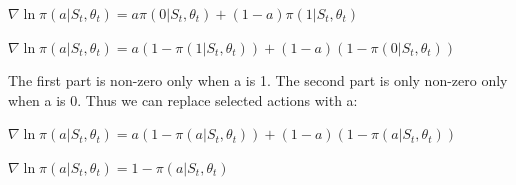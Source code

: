 \documentclass[11pt]{article}
\begin{document}
    \noindent $  \nabla \ln \pi(a | S_t, \theta_t) = a \pi(0 | S_t, \theta_t) + (1-a) \pi(1 | S_t, \theta_t)  $

    \noindent $  \nabla \ln \pi(a | S_t, \theta_t) = a (1 - \pi(1 | S_t, \theta_t)) + (1-a) (1- \pi(0 | S_t, \theta_t))  $

    \hfill \break
    \noindent The first part is non-zero only when a is 1.
    The second part is only non-zero only when a is 0.
    Thus we can replace selected actions with a:

    \noindent $  \nabla \ln \pi(a | S_t, \theta_t) = a (1 - \pi(a | S_t, \theta_t)) + (1-a) (1- \pi(a | S_t, \theta_t))  $

    \noindent $  \nabla \ln \pi(a | S_t, \theta_t) = 1- \pi(a | S_t, \theta_t) $
\end{document}
